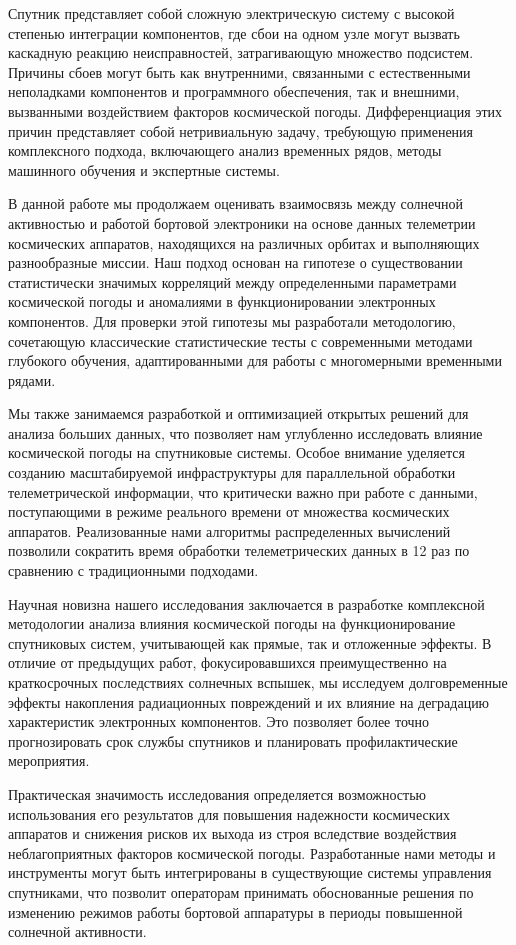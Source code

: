 Спутник представляет собой сложную электрическую систему с высокой степенью
интеграции компонентов, где сбои на одном узле могут вызвать каскадную реакцию
неисправностей, затрагивающую множество подсистем. Причины сбоев могут быть как
внутренними, связанными с естественными неполадками компонентов и программного
обеспечения, так и внешними, вызванными воздействием факторов космической
погоды. Дифференциация этих причин представляет собой нетривиальную задачу,
требующую применения комплексного подхода, включающего анализ временных рядов,
методы машинного обучения и экспертные системы.

В данной работе мы продолжаем оценивать взаимосвязь между солнечной активностью
и работой бортовой электроники на основе данных телеметрии космических
аппаратов, находящихся на различных орбитах и выполняющих разнообразные миссии.
Наш подход основан на гипотезе о существовании статистически значимых корреляций
между определенными параметрами космической погоды и аномалиями в
функционировании электронных компонентов. Для проверки этой гипотезы мы
разработали методологию, сочетающую классические статистические тесты с
современными методами глубокого обучения, адаптированными для работы с
многомерными временными рядами.

Мы также занимаемся разработкой и оптимизацией открытых решений для анализа
больших данных, что позволяет нам углубленно исследовать влияние космической
погоды на спутниковые системы. Особое внимание уделяется созданию масштабируемой
инфраструктуры для параллельной обработки телеметрической информации, что
критически важно при работе с данными, поступающими в режиме реального времени
от множества космических аппаратов. Реализованные нами алгоритмы распределенных
вычислений позволили сократить время обработки телеметрических данных в 12 раз
по сравнению с традиционными подходами.

Научная новизна нашего исследования заключается в разработке комплексной
методологии анализа влияния космической погоды на функционирование спутниковых
систем, учитывающей как прямые, так и отложенные эффекты. В отличие от
предыдущих работ, фокусировавшихся преимущественно на краткосрочных последствиях
солнечных вспышек, мы исследуем долговременные эффекты накопления радиационных
повреждений и их влияние на деградацию характеристик электронных компонентов.
Это позволяет более точно прогнозировать срок службы спутников и планировать
профилактические мероприятия.

Практическая значимость исследования определяется возможностью использования его
результатов для повышения надежности космических аппаратов и снижения рисков их
выхода из строя вследствие воздействия неблагоприятных факторов космической
погоды. Разработанные нами методы и инструменты могут быть интегрированы в
существующие системы управления спутниками, что позволит операторам принимать
обоснованные решения по изменению режимов работы бортовой аппаратуры в периоды
повышенной солнечной активности.
